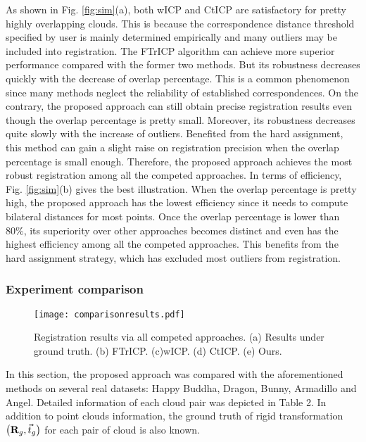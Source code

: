 \documentclass[review]{elsarticle}
\begin{document}
As shown in Fig. \ref{fig:sim}(a), both wICP and CtICP are satisfactory for pretty highly overlapping clouds. This is because the correspondence distance threshold specified by user is mainly determined empirically and many outliers may be included into registration. The FTrICP algorithm can achieve more superior performance compared with the former two methods. But its robustness decreases quickly with the decrease of overlap percentage. This is a common phenomenon since many methods neglect the reliability of established correspondences. On the contrary, the proposed approach can still obtain precise registration results even though the overlap percentage is pretty small. Moreover, its robustness decreases quite slowly with the increase of outliers. Benefited from the hard assignment, this method can gain a slight raise on registration precision when the overlap percentage is small enough. Therefore, the proposed approach achieves the most robust registration among all the competed approaches. In terms of efficiency, Fig. \ref{fig:sim}(b) gives the best illustration. When the overlap percentage is pretty high, the proposed approach has the lowest efficiency since it needs to compute bilateral distances for most points. Once the overlap percentage is lower than $80\% $, its superiority over other approaches becomes distinct and even has the highest efficiency among all the competed approaches. This benefits from the hard assignment strategy, which has excluded most outliers from registration.



\subsubsection{Experiment comparison}

\begin{figure*}[!htb]
\centering
\centerline{\texttt{[image: comparisonresults.pdf]}}

\caption{ Registration results via all competed approaches. (a) Results under ground truth. (b) FTrICP. (c)wICP. (d) CtICP. (e) Ours.}\medskip
\label{fig:setscom}

\end{figure*}


In this section, the proposed approach was compared with the aforementioned methods on several real datasets: Happy Buddha, Dragon, Bunny, Armadillo and Angel. Detailed information of each cloud pair was depicted in Table 2. In addition to point clouds information, the ground truth of rigid transformation $\left( {{{\bf{R}}_g},{{\vec t }_g}} \right)$ for each pair of cloud is also known.
\end{document}
